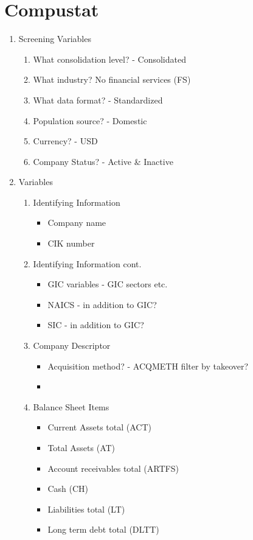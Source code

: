 \documentclass[12pt]{article}
\begin{document}
\section{Compustat}
\begin{enumerate}

    \item Screening Variables
   
    \begin{enumerate}
        \item What consolidation level? - Consolidated
        \item What industry? No financial services (FS) 
        \item What data format?  - Standardized 
        \item Population source? - Domestic 
        \item Currency? - USD 
        \item Company Status? - Active \& Inactive  
    \end{enumerate}
   
    \item Variables 
    
    \begin{enumerate}
        \item Identifying Information
        \begin{itemize}
            \item Company name 
            \item CIK number 
        \end{itemize}
    
        \item Identifying Information cont.  
        \begin{itemize}
            \item GIC variables - GIC sectors etc.
            \item NAICS - in addition to GIC? 
            \item SIC - in addition to GIC?
        \end{itemize}

        \item Company Descriptor
        \begin{itemize}
            \item Acquisition method? - ACQMETH filter by takeover? 
            \item 
        \end{itemize}
        
        \item Balance Sheet Items 
        \begin{itemize}
            \item Current Assets total (ACT)
            \item Total Assets (AT)
            \item Account receivables total (ARTFS)
            \item Cash (CH)
            \item Liabilities total (LT) 
            \item Long term debt total (DLTT)
        \end{itemize}
        

\end{enumerate}
\end{enumerate}
\end{document}
